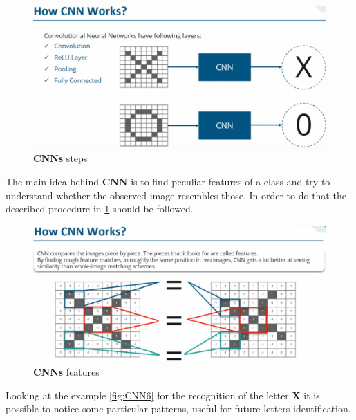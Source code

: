 \documentclass[11pt]{article}
\begin{document}
\begin{figure}[h]
\centering
\captionsetup{justification=centering}
\includegraphics[width=0.9\linewidth]{CNN4.pdf}
\caption{ \textbf{CNNs}  steps }
\label{fig:CNN4}
\end{figure}
\clearpage
The main idea behind \textbf{CNN} is to find peculiar features of  a class and try to understand whether the observed image resembles those. In order to do that the described procedure in \ref{fig:CNN4} should be followed.
\begin{figure}[h]
\centering
\captionsetup{justification=centering}
\includegraphics[width=0.9\linewidth]{CNN5.pdf}
\caption{ \textbf{CNNs}  features  }
\label{fig:CNN5}
\end{figure}

Looking at the example \ref{fig:CNN6} for  the recognition of the letter \textbf{X} it is possible to notice  some particular patterns, useful for future letters identification.
\end{document}
